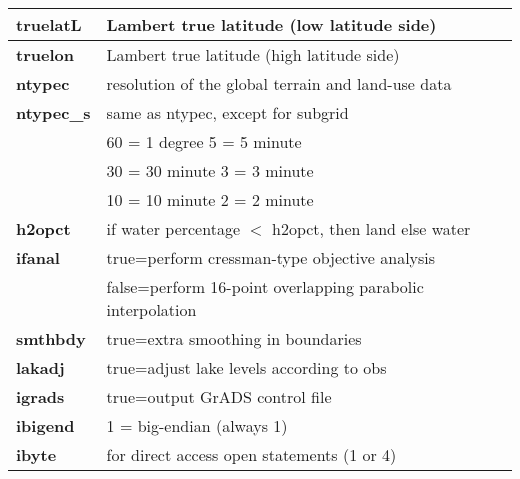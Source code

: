 \begin{table}[h]
\begin{center}
\begin{tabular}{|l|l|}
{\footnotesize {\bf truelatL}} &   {\footnotesize Lambert true latitude (low  latitude side)} \\  \hline
{\footnotesize {\bf truelon}} &   {\footnotesize Lambert true latitude (high latitude side)} \\  \hline
{\footnotesize {\bf ntypec}} & {\footnotesize resolution of the global terrain and land-use data} \\ \hline
{\footnotesize {\bf ntypec\_s}} & {\footnotesize same as ntypec, except for subgrid} \\ \hline
 &  \vspace{-0.15 cm} \hspace{0.5 cm} {\footnotesize 60 = 1 degree \hspace{1.25cm} 5 = 5 minute} \\ \hline
 &  \vspace{-0.15 cm} \hspace{0.5 cm} {\footnotesize 30 = 30 minute \hspace{1.1cm} 3 = 3 minute} \\ \hline
 &  \hspace{0.5 cm} {\footnotesize 10 = 10 minute \hspace{1cm} 2 = 2 minute } \\ \hline
{\footnotesize {\bf h2opct}}  & {\footnotesize if water percentage $<$ h2opct, then land else water} \\ \hline
{\footnotesize {\bf ifanal}}  & {\footnotesize  true=perform cressman-type objective analysis} \\  
 & {\footnotesize  false=perform 16-point overlapping parabolic interpolation} \\ \hline
{\footnotesize {\bf smthbdy}}  & {\footnotesize true=extra smoothing in boundaries} \\ \hline
{\footnotesize {\bf lakadj}}   & {\footnotesize true=adjust lake levels according to obs} \\ \hline
{\footnotesize {\bf igrads}}   & {\footnotesize true=output GrADS control file} \\ \hline
{\footnotesize {\bf ibigend}}  & {\footnotesize 1 = big-endian (always 1)} \\ \hline
{\footnotesize {\bf ibyte}}    & {\footnotesize for direct access open statements (1 or 4)} \\ \hline


\end{tabular}
\end{center}
\end{table}
